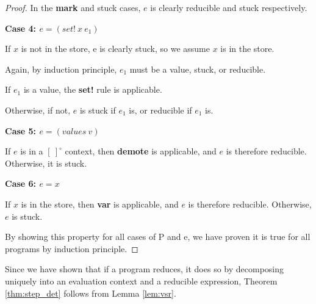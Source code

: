 \begin{proof}
In the \textbf{mark} and stuck cases, $e$ is clearly reducible and stuck respectively.


\textbf{Case 4: $e = (set!\ x\ e_1)$}

If $x$ is not in the store, e is clearly stuck, so we assume $x$ is in the store.

Again, by induction principle, $e_1$ must be a value, stuck, or reducible.

If $e_1$ is a value, the \textbf{set!} rule is applicable.

Otherwise, if not, $e$ is stuck if $e_1$ is, or reducible if $e_1$ is.

\textbf{Case 5: $e = (values\ v)$}

If $e$ is in a $[\ ]^{\circ}$ context, then \textbf{demote} is applicable, and $e$ is therefore reducible. Otherwise, it is stuck.

\textbf{Case 6: $e = x$}

If $x$ is in the store, then \textbf{var} is applicable, and $e$ is therefore reducible. Otherwise, $e$ is stuck.

By showing this property for all cases of P and e, we have proven it is true for all programs by induction principle.
\end{proof}

Since we have shown that if a program reduces, it does so by decomposing uniquely into an evaluation context and a reducible expression, Theorem \ref{thm:step_det} follows from Lemma \ref{lem:vsr}. 




